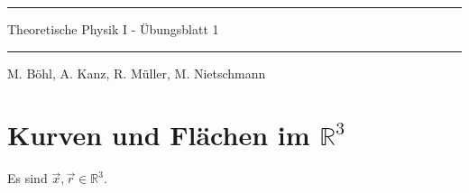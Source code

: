 \documentclass[11pt]{article}
\theoremstyle{plain}
\theoremstyle{definition}
\theoremstyle{remark}
\newcommand{\R}{\mathbb{R}}
\begin{document}
\pagestyle{fancy}
\thispagestyle{plain}

\rule{\textwidth}{.5pt}
\begin{center}
\Huge{Theoretische Physik I - Übungsblatt 1}
\end{center}

\rule{\textwidth}{.5pt}
\text{} \hfill M. Böhl, A. Kanz, R. Müller, M. Nietschmann




\section{Kurven und Flächen im $ \R^3 $} 

Es sind $ \vec{x},\vec{r} \in \R^3 $. 
\end{document}
